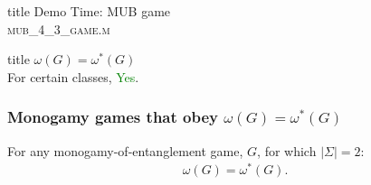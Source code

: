 \documentclass{beamer}
\newcommand{\abs}[1]{\lvert #1 \rvert}
\begin{document}
\begin{frame} [noframenumbering]
  \vfill
  \centering
  \begin{beamercolorbox}[sep=8pt,center,shadow=true,rounded=true]{title}
    Demo Time: MUB game \\ \textsc{mub\_4\_3\_game.m}
  \end{beamercolorbox}
  \vfill
\end{frame}

\begin{frame}[noframenumbering]
  \vfill
  \centering
  \begin{beamercolorbox}[sep=8pt,center,shadow=true,rounded=true]{title}
     $\omega(G) = \omega^*(G)$ \\ For certain classes, \textcolor{green}{Yes}.
  \end{beamercolorbox}
  \vfill
  \end{frame}

\begin{frame}
	\frametitle{Monogamy games that obey $\omega(G) = \omega^*(G)$}
	\begin{theorem}
		For any monogamy-of-entanglement game, $G$, for which $\abs{\Sigma} = 2$:
		\begin{align*}
			\omega(G) = \omega^*(G).
		\end{align*}
	\end{theorem}
\end{frame}
\end{document}
